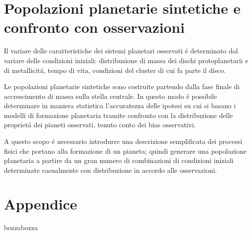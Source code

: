 \documentclass[twoside,11pt,fleqn]{memoir}%
\def\versione{bozza}%
\def\bozza{bozza}
\begin{document}
{\let\clearpage\relax\let\cleardoublepage\relax
\part{Popolazioni planetarie sintetiche e confronto con osservazioni}
}


\begin{errata}
Il variare delle caratteristiche dei sistemi planetari osservati \'e determinato dal variare delle condizioni iniziali: distribuzione di massa dei dischi protoplanetarii e di metallicit\'a, tempo di vita, condizioni del cluster di cui fa parte il disco.
\end{errata}

Le popolazioni planetarie sintetiche sono costruite partendo dalla fase finale di accrescimento di massa sulla stella centrale. In questo modo \'e possibile determinare in maniera statistica l'accuratezza delle ipotesi su cui si basano i modelli di formazione planetaria tramite confronto con la distribuzione delle propriet\'a dei pianeti osservati, tenuto conto dei bias osservativi.

A questo scopo  \'e necessario introdurre una descrizione semplificata dei processi fisici che portano alla formazione di un pianeta; quindi generare una popolazione planetaria a partire da un gran numero di combinazioni di condizioni iniziali determinate casualmente con distribuzione in accordo alle osservazioni.


\cleartorecto



{\let\clearpage\relax\let\cleardoublepage\relax
\backmatter
}

\appendix
\part{Appendice}

\printbibliography
\ifx\versione\bozza
\woc
\erratac
\fi
\end{document}
